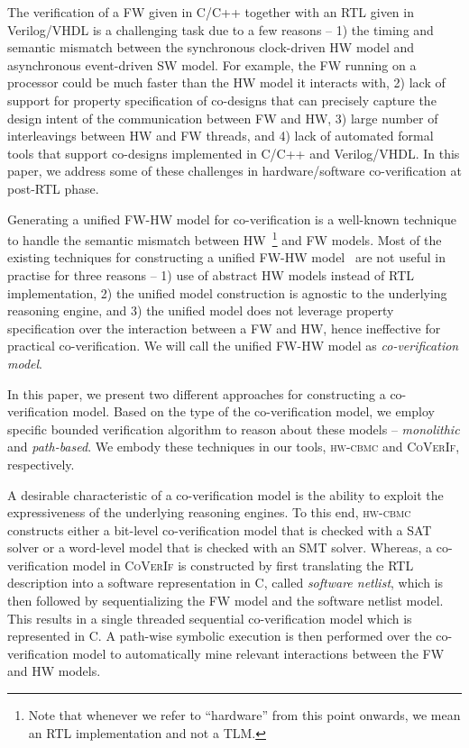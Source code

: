 \documentclass[sigconf]{acmart}
\newcommand{\tool}[1]{\textsc{#1}\xspace}
\newcommand{\hwcbmcv}{\tool{hw-cbmc}}
\newcommand{\verifox}{\tool{CoVerIf}}
\begin{document}
The verification of a FW given in C/C++ together with an RTL given in 
Verilog/VHDL is a challenging task due to a
few reasons -- 1) the timing and semantic mismatch between the synchronous
clock-driven HW model and asynchronous event-driven SW model. For example, the
FW running on a processor could be much faster than the HW
model it interacts with, 2) lack of support for property specification of 
co-designs that can precisely capture the design intent of the 
communication between FW and HW, 3) large
number of interleavings between HW and FW threads, and 4) lack 
of automated formal tools that support co-designs implemented in C/C++ and 
Verilog/VHDL.   In this paper, we address some of these challenges in 
hardware/software co-verification at post-RTL phase. 


Generating a unified FW-HW model for co-verification is a 
well-known technique to handle the semantic mismatch between  
HW~\footnote{Note that whenever we refer to ``hardware'' 
from this point onwards, we mean an RTL implementation 
and not a TLM.}  and FW models.  Most of the existing techniques 
for constructing a unified FW-HW model~\cite{fmsd02,emsoft07,fase10} 
are not useful in practise for three reasons -- 1) use of abstract HW models 
instead of RTL implementation, 2) the unified model
construction is agnostic to the underlying reasoning engine, and 3) 
the unified model does not leverage property specification over the
interaction between a FW and HW, hence ineffective for practical co-verification.  
We will call the unified FW-HW model as \emph{co-verification model}. 

In this paper, we present two different approaches for constructing a
co-verification model.  Based on the type of the co-verification model, 
we employ specific bounded verification algorithm to reason about these models
-- \emph{monolithic} and \emph{path-based}.  We embody these techniques 
in our tools, \hwcbmcv and \verifox, respectively. 


A desirable characteristic of a co-verification model is the ability to exploit 
the expressiveness of the underlying reasoning engines.  To this end, \hwcbmcv
constructs either a bit-level co-verification model that is checked with a SAT solver 
or a word-level model that is checked with an SMT solver.  Whereas, a 
co-verification model in \verifox is constructed 
by first translating the RTL description into a software representation in C,
called \emph{software netlist}, which is then followed by sequentializing the FW 
model and the software netlist model.  This results in a single
threaded sequential co-verification model which is represented in C. A path-wise 
symbolic execution is then performed over the co-verification model to
automatically mine relevant interactions between the FW and HW models.   
\end{document}
